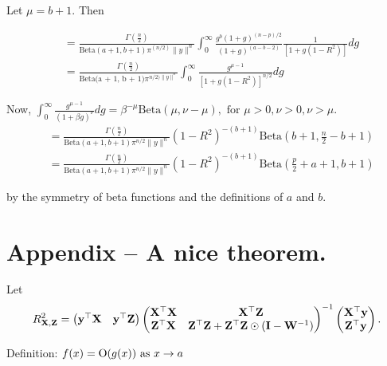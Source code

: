 \documentclass{amsart}[12pt]
\begin{document}
Let $\mu = b + 1$. Then

\begin{equation*}
	\begin{array}{ll}
		  & =\frac{\Gamma(\frac{n}{2})}{\text{Beta}(a + 1,  b + 1) \pi^(n/2) \| y \|^n}  
		\int_0^\infty \frac{g^b(1 + g)^{(n - p)/2}}{(1 + g)^{(a - b - 2)}} \frac{1}{[1 + g(1 - R^2)]} dg \\
		  & = \frac{\Gamma(\frac{n}{2})}{\text{Beta(a + 1, b + 1)} \pi^{n/2) \| y \|^n}} 
		\int_0^\infty \frac{g^{\mu - 1}}{[1 + g (1 - R^2)]^{n/2}} dg
	\end{array}
\end{equation*}

Now, $\int_0^\infty \frac{g^{\mu - 1}}{(1 + \beta g)^\nu} dg = \beta^{-\mu} \text{Beta}(\mu, \nu - \mu), \text{ for } \mu > 0, \nu > 0, \nu > \mu$.
\begin{equation*}
	\begin{array}{ll}
		  & = \frac{\Gamma(\frac{n}{2})}{\text{Beta}(a + 1, b + 1) \pi^{n / 2} \| y \|^n} (1 - R^2)^{-(b + 1)} \text{Beta}(b + 1, \frac{n}{2} - b + 1) \\
		  & = \frac{\Gamma(\frac{n}{2})}{\text{Beta}(a + 1, b + 1) \pi^{n / 2} \| y \|^n} (1 - R^2)^{-(b + 1)} \text{Beta}(\frac{p}{2} + a + 1, b + 1) 
	\end{array}
\end{equation*}

by the symmetry of beta functions and the definitions of $a$ and $b$.

\section{Appendix -- A nice theorem.}
Let
\begin{equation*}
	R^2_{{\bf X}, {\bf Z}} = 
	\begin{pmatrix}
		{\bf y}^\top {\bf X} & {\bf y}^\top {\bf Z} 
	\end{pmatrix}
	\begin{pmatrix}
		{\bf X}^\top {\bf X} & {\bf X}^\top {\bf Z}                                       \\
		{\bf Z}^\top {\bf X} & {\bf Z}^\top {\bf Z} + {\bf Z}^\top {\bf Z} \odot ({\bf I} - {\bf W}^{-1}) 
	\end{pmatrix}^{-1}
	\begin{pmatrix}
		{\bf X}^\top {\bf y} \\
		{\bf Z}^\top {\bf y} 
	\end{pmatrix}.
\end{equation*}

Definition:
$f(x) = \text{O}(g(x)) \text{ as } x \to a$
\end{document}
